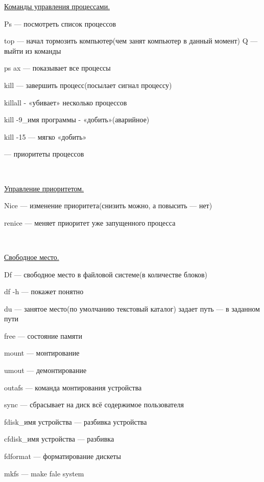 \par 
\underline{Команды управления процессами.}
\par 
Ps — посмотреть список процессов
\par 
top — начал тормозить компьютер(чем занят
компьютер в данный момент) Q — выйти из
команды
\par 
ps ax — показывает все процессы
\par 
kill — завершить процесс(посылает сигнал
процессу)
\par 
killall - «убивает» несколько процессов
\par 
kill -9\_имя программы - «добить»(аварийное)
\par 
kill -15 — мягко «добить»
\par 
[-20 — 19] — приоритеты процессов
\par 
\\

\par 
\underline{Управление приоритетом.}
\par 
Nice — изменение приоритета(снизить
можно, а повысить — нет)
\par 
renice — меняет приоритет уже запущенного
процесса
\par 
\\

\par 
\underline{Свободное место.}
\par 
Df — свободное место в файловой системе(в
количестве блоков)
\par 
df -h — покажет понятно
\par 
du — занятое место(по умолчанию текстовый
каталог) задает путь — в заданном пути
\par 
free — состояние памяти
\par 
mount — монтирование 

\par 
umout — демонтирование 

\par 
outafs — команда монтирования устройства
\par 
sync — сбрасывает на диск всё содержимое
пользователя
\par 
fdisk\_имя устройства — разбивка устройства

\par 
cfdisk\_имя устройства — разбивка 

\par 
fdformat — форматирование дискеты
\par 
mkfs — make fale system 

